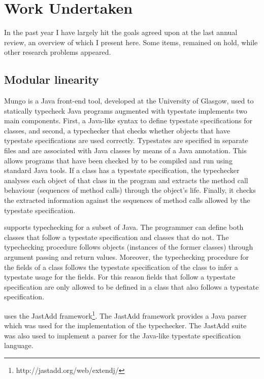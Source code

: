 \section{Work Undertaken}
\label{Research}

In the past year I have largely hit the goals agreed upon at the
last annual review, an overview of which I present here. Some items, remained on hold, while other research problems appeared.

\subsection{Modular linearity}
\label{sub:modlinearity}


Mungo\cite{kouzapas16} is a Java front-end tool, developed at the University of Glasgow, used to statically typecheck Java programs augmented with typestate
\Mungo implements two main components. First, a Java-like syntax to define
typestate specifications for classes, and second, a typechecker
that checks whether objects that have typestate specifications are used correctly. Typestates are specified in separate files and
are associated with Java classes by means of a Java
annotation. This allows programs that have been
checked by \Mungo to be compiled and run using standard
Java tools. If a class has a typestate specification, the \Mungo typechecker analyses each object of that class in the program and extracts the
method call behaviour (sequences of method calls) through the object's life. Finally, it checks the extracted information against
the sequences of method calls allowed by the typestate specification.



\Mungo supports typechecking for a subset of Java.
The programmer can define both classes that follow
a typestate specification and classes that do not.
The typechecking procedure follows objects (instances
of the former classes) through argument passing and
return values. Moreover, the typechecking procedure
for the fields of a class follows the typestate
specification of the class to infer a typestate
usage for the fields. For this reason fields that
follow a typestate specification are only allowed to be defined
in a class that also follows a typestate specification.

\Mungo uses the JastAdd framework\footnote{http://jastadd.org/web/extendj/}\cite{jastadd}. The JastAdd framework provides a Java parser
which was used for the implementation of the \Mungo typechecker. The JastAdd suite was also used to implement a parser
for the Java-like typestate specification language.

